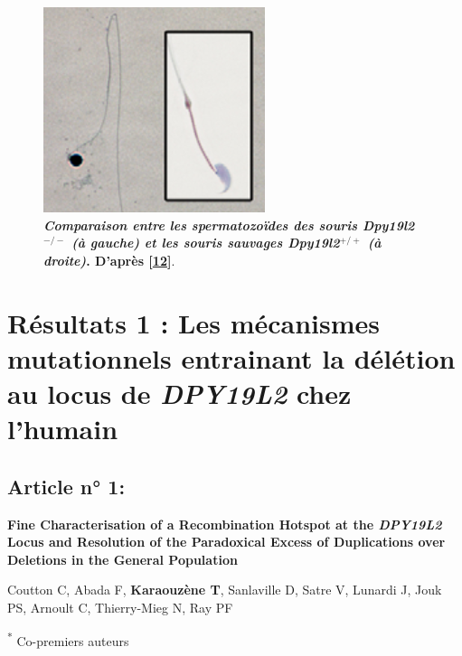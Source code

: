 \documentclass[12pt,twoside]{ugathesis}
\begin{document}
\newpage 

\begin{figure}

{\centering \includegraphics[scale=0.8]{figure/mouse_globo_spz} 

}

\caption[Comparaison entre les spermatozoïdes des souris *Dpy19l2*$^{-/-}$ (à gauche) et les souris sauvages *Dpy19l2*$^{+/+}$ (à droite)]{\textbf{\emph{Comparaison entre les spermatozoïdes
des souris \emph{Dpy19l2}\(^{-/-}\) (à gauche) et les souris sauvages
\emph{Dpy19l2}\(^{+/+}\) (à droite)}. D'après
{[}\protect\hyperlink{ref-Pierre2012}{12}{]}}.}\label{fig:pictmouseglobo}
\end{figure}






\newpage

\section{\texorpdfstring{Résultats 1 : Les mécanismes mutationnels
entrainant la délétion au locus de \emph{DPY19L2} chez
l'humain}{Résultats 1 : Les mécanismes mutationnels entrainant la délétion au locus de DPY19L2 chez l'humain}}\label{mecamut}

\subsection{Article n° 1:}\label{article-n-1}

\textbf{Fine Characterisation of a Recombination Hotspot at the
\emph{DPY19L2} Locus and Resolution of the Paradoxical Excess of
Duplications over Deletions in the General Population}

Coutton C, Abada F, \textbf{Karaouzène T}, Sanlaville D, Satre V,
Lunardi J, Jouk PS, Arnoult C, Thierry-Mieg N, Ray PF

\textsuperscript{*} Co-premiers auteurs
\end{document}
